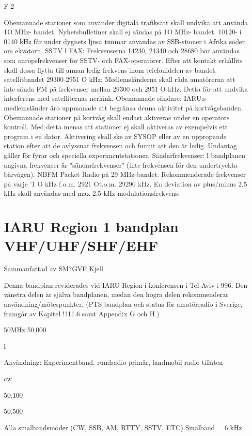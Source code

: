 \documentclass[a4paper,twoside,twocolumn,openright]{book}
\begin{document}
{{{{{{{{{{{F-2

Obemannade stationer som använder digitala trafiksätt
skall undvika att använda 1O MHz- bandet.
Nyhetsbulletiner skall ej sändas på 1O MHz- bandet.
10120- i 0140 kHz får under dygnets ljusa timmar användas av SSB-stioner i Afrika söder om ekvatorn.
SSTV l FAX:
Frekvenserna 14230, 21340 och 28680 bör användas
som anropsfrekvenser för SSTV- och FAX-operatörer.
Efter att kontakt erhållits skall dessa flytta till annan
ledig frekvens inom telefonidelen av bandet.
satellitbandet 29300-2951 O kHz:
Medlemsländerna skall råda amatörerna att inte sända
FM på frekvenser mellan 29300 och 2951 O kHz. Detta
för att undvika interferens med satelliternas nerlänk.
Obemannade sändare:
IARU:s medlemsländer äro uppmanade att begränsa
denna aktivitet på kortvågsbanden.
Obemannade stationer på kortvåg skall endast aktiveras under en operatörs kontroll.
Med detta menas att stationer ej skall aktiveras av
exempelvis ett program i en dator. Aktivering skall ske
av SYSOP eller av en uppropande station efter att de
avlyssnat frekvensen och funnit att den är ledig.
Undantag gäller för fyrar och speciella experimentstationer.
Sändarfrekvenser:
l bandplanen angivna frekvenser är "sändarfrekvenser"
(inte frekvensen för den undertryckta bärvågen).
NBFM Packet Radio på 29 MHz-bandet:
Rekommenderade frekvenser på varje '1 O kHz f.o.m.
2921 Ot.o.m. 29290 kHz. En deviation av plus/minus 2.5
kHz skall användas med max 2.5 kHz modulationsfrekvens.

\chapter{IARU Region 1 bandplan VHF/UHF/SHF/EHF}

Sammanfattad av SM?GVF Kjell

Denna bandplan reviderades vid IARU Region i-konferensen i Tel-Aviv i 996.
Den vänstra delen är själva bandplanen, medan den högra delen rekommenderar användning/mötespunkter.
(PTS bandplan och status för amatörradio i Sverige, framgår av Kapitel !111.6 samt Appendix G och H.)

50MHz
50,000

l

Användning: Experimentband, rundradio primär, landmobil radio tillåten

cw

50,100

50,500

Alla smalbandsmoder
(CW, SSB, AM, RTTY,
SSTV, ETC)
Smalband = 6 kHz

}}}}}}}}}}}
\end{document}
